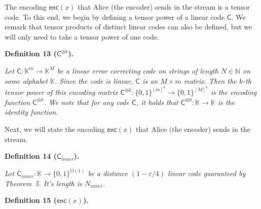 The encoding $\mathsf{enc}(x)$ that Alice (the encoder) sends in the stream is a tensor code. To this end, we begin by defining a tensor power of a linear code $\mathsf{C}$. We remark that tensor products of distinct linear codes can also be defined, but we will only need to take a tensor power of one code.\par





\par\medskip\noindent\textbf{
\textbf{Definition 13}\textbf{ }($\mathsf{C}^{\otimes k}$)\textbf{.}
}\par



\emph{Let $\mathsf{C}:\mathbb{K}^{m}\to\mathbb{K}^{M}$ be a linear error correcting code on strings of length $N\in\mathbb{N}$ on some alphabet $\mathbb{K}$. Since the code is linear, $\mathsf{C}$ is an $M\times m$ matrix. Then the $k$-th tensor power of this encoding matrix $\mathsf{C}^{\otimes k}:\{0,1\}^{[m]^{k}}\to\{0,1\}^{[M]^{k}}$ is the encoding function $\mathsf{C}^{\otimes k}$. We note that for any code $\mathsf{C}$, it holds that $\mathsf{C}^{\otimes 0}:\mathbb{K}\to\mathbb{K}$ is the identity function.}\par






Next, we will state the encoding $\mathsf{enc}(x)$ that Alice (the encoder) sends in the stream.\par





\par\medskip\noindent\textbf{
\textbf{Definition 14}\textbf{ }($\mathsf{C}_{inner}$)\textbf{.}
}\par



\emph{Let $\mathsf{C}_{inner}:\mathbb{K}\to\{0,1\}^{O(1)}$ be a distance $(1-\varepsilon/4)$ linear code guaranteed by Theorem 5. It’s length is $N_{inner}$.}\par







\par\medskip\noindent\textbf{
\textbf{Definition 15}\textbf{ }($\mathsf{enc}(x)$)\textbf{.}
}\par



